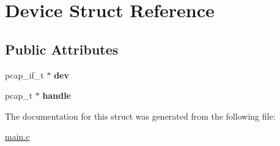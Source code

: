 \hypertarget{structDevice}{}\section{Device Struct Reference}
\label{structDevice}
\subsection*{Public Attributes}
\begin{DoxyCompactItemize}
\item 
\mbox{\label{structDevice_a509e9a787a2f9f5a4567e6d7e841d49e}} 
pcap\+\_\+if\+\_\+t $\ast$ {\bfseries dev}
\item 
\mbox{\label{structDevice_aeb6645a182c92f39e2f024a621836c5e}} 
pcap\+\_\+t $\ast$ {\bfseries handle}
\end{DoxyCompactItemize}


The documentation for this struct was generated from the following file\+:\begin{DoxyCompactItemize}
\item 
\mbox{\hyperlink{main_8c}{main.\+c}}\end{DoxyCompactItemize}
